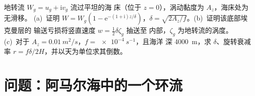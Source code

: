 \begin{exercise}[$\star\star\star$]\label{exo:b3:ocean-dynamics:12}
地转流 $W_g = u_g + \mathrm iv_g$ 流过平坦的海
床（位于 $z = 0$），涡动黏度为 $A_z$，海床处为无滑移。
(a)~证明 $W = W_g(1 - \mathrm e^{-(1+\mathrm i)z/\delta})$，$\delta =
\sqrt{2A_z/f}$。(b)~证明该底部埃克曼层的
输送亏损将竖直速度 $w = \tfrac12\delta\zeta_g$ 抽送至
内部，$\zeta_g$ 为地转流的涡度。(c)~对于
$A_z = \qty{0.01}{m^2/s}$，$f = \qty{e-4}{s^{-1}}$，且海洋
深 \qty{4000}{m}，求 $\delta$、旋转衰减率 $r =
f\delta/2H$，并以天为单位求其倒数。
\end{exercise}

\section{问题：阿马尔海中的一个环流}

